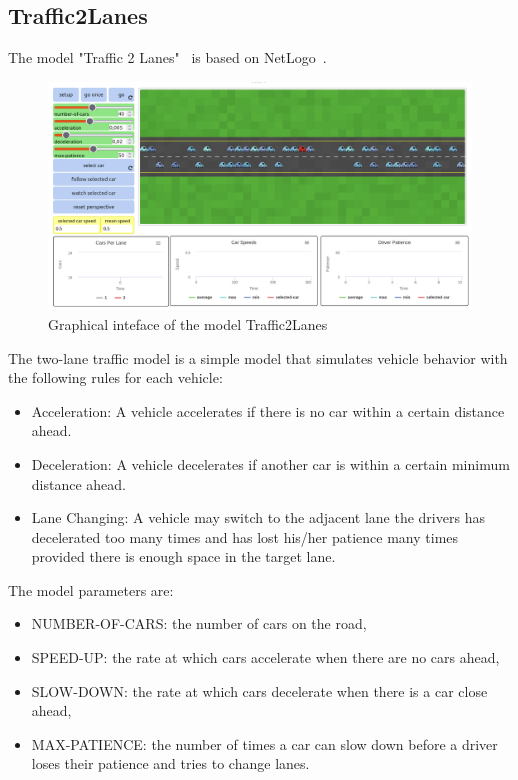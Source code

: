 \documentclass[10pt,letterpaper]{article}
\theoremstyle{definition}
\theoremstyle{remark}
\begin{document}


\subsection*{Traffic2Lanes}

The model "Traffic 2 Lanes"~\cite{wilensky1998netlogo} is based on NetLogo~\cite{wilensky1999netlogo}.

\begin{figure}
    \centering
    \includegraphics[width=1.0\linewidth]{images/traffic2lanes.png}
    \caption{Graphical inteface of the model Traffic2Lanes}
    \label{fig:traffic2lanes}
\end{figure}

The two-lane traffic model is a simple model that simulates vehicle behavior with the following rules for each vehicle:
\begin{itemize}
    \item Acceleration: A vehicle accelerates if there is no car within a certain distance ahead.
    \item Deceleration: A vehicle decelerates if another car is within a certain minimum distance ahead.
    \item Lane Changing: A vehicle may switch to the adjacent lane the drivers has decelerated too many times and has lost his/her patience many times provided there is enough space in the target lane.
\end{itemize}
    
The model parameters are:
\begin{itemize}
    \item NUMBER-OF-CARS: the number of cars on the road,
    \item SPEED-UP: the rate at which cars accelerate when there are no cars ahead,
    \item SLOW-DOWN: the rate at which cars decelerate when there is a car close ahead,
    \item MAX-PATIENCE: the number of times a car can slow down before a driver loses their patience and tries to change lanes.
\end{itemize}
\end{document}
